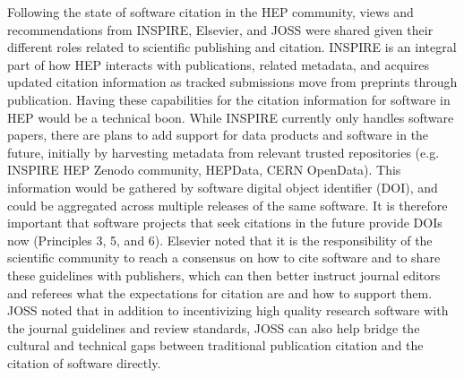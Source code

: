 Following the state of software citation in the HEP community, views and recommendations from INSPIRE, Elsevier, and JOSS were shared given their different roles related to scientific publishing and citation.
INSPIRE is an integral part of how HEP interacts with publications, related metadata, and acquires updated citation information as tracked submissions move from preprints through publication.
Having these capabilities for the citation information for software in HEP would be a technical boon.
While INSPIRE currently only handles software papers, there are plans to add support for data products and software in the future, initially by harvesting metadata from relevant trusted repositories (e.g. INSPIRE HEP Zenodo community, HEPData, CERN OpenData).
This information would be gathered by software digital object identifier (DOI), and could be aggregated across multiple releases of the same software.
It is therefore important that software projects that seek citations in the future provide DOIs now (Principles 3, 5, and 6).
Elsevier noted that it is the responsibility of the scientific community to reach a consensus on how to cite software and to share these guidelines with publishers, which can then better instruct journal editors and referees what the expectations for citation are and how to support them.
JOSS noted that in addition to incentivizing high quality research software with the journal guidelines and review standards, JOSS can also help bridge the cultural and technical gaps between traditional publication citation and the citation of software directly.
